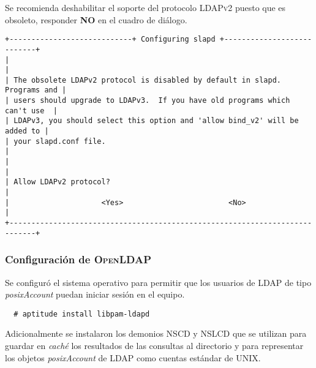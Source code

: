 Se recomienda deshabilitar el soporte del protocolo \textsc{LDAPv2} puesto que es obsoleto, responder \textbf{NO} en el cuadro de di\'{a}logo.

{
\scriptsize
\linespread{1}
\begin{verbatim}
+----------------------------+ Configuring slapd +---------------------------+
|                                                                            |
| The obsolete LDAPv2 protocol is disabled by default in slapd. Programs and |
| users should upgrade to LDAPv3.  If you have old programs which can't use  |
| LDAPv3, you should select this option and 'allow bind_v2' will be added to |
| your slapd.conf file.                                                      |
|                                                                            |
| Allow LDAPv2 protocol?                                                     |
|                     <Yes>                        <No>                      |
+----------------------------------------------------------------------------+
\end{verbatim}
}

          \subsubsection {Configuraci\'{o}n de \textsc{OpenLDAP}}

Se configur\'{o} el sistema operativo para permitir que los usuarios de \textsc{LDAP} de tipo \textit{posixAccount} puedan iniciar sesi\'{o}n en el equipo.

{
\scriptsize
\linespread{1}
\begin{verbatim}
  # aptitude install libpam-ldapd
\end{verbatim}
}

Adicionalmente se instalaron los demonios \textsc{NSCD} y \textsc{NSLCD} que se utilizan para guardar en \textit{cach\'{e}} los resultados de las consultas al directorio y para representar los objetos \textit{posixAccount} de \textsc{LDAP} como cuentas est\'{a}ndar de \textsc{UNIX}.

